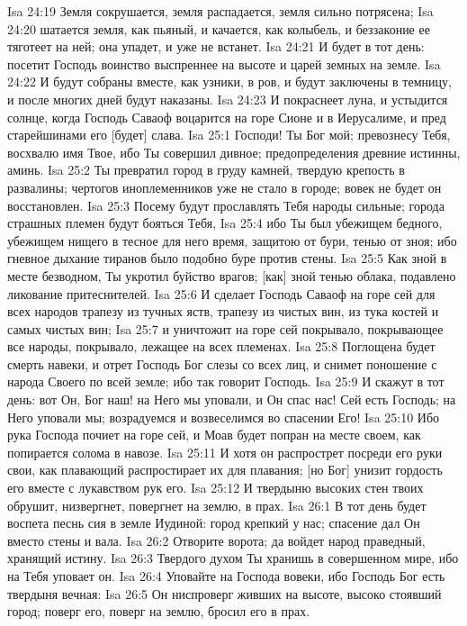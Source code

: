 Isa 24:19  Земля сокрушается, земля распадается, земля сильно потрясена;
Isa 24:20  шатается земля, как пьяный, и качается, как колыбель, и беззаконие ее тяготеет на ней; она упадет, и уже не встанет.
Isa 24:21  И будет в тот день: посетит Господь воинство выспреннее на высоте и царей земных на земле.
Isa 24:22  И будут собраны вместе, как узники, в ров, и будут заключены в темницу, и после многих дней будут наказаны.
Isa 24:23  И покраснеет луна, и устыдится солнце, когда Господь Саваоф воцарится на горе Сионе и в Иерусалиме, и пред старейшинами его [будет] слава.
Isa 25:1  Господи! Ты Бог мой; превознесу Тебя, восхвалю имя Твое, ибо Ты совершил дивное; предопределения древние истинны, аминь.
Isa 25:2  Ты превратил город в груду камней, твердую крепость в развалины; чертогов иноплеменников уже не стало в городе; вовек не будет он восстановлен.
Isa 25:3  Посему будут прославлять Тебя народы сильные; города страшных племен будут бояться Тебя,
Isa 25:4  ибо Ты был убежищем бедного, убежищем нищего в тесное для него время, защитою от бури, тенью от зноя; ибо гневное дыхание тиранов было подобно буре против стены.
Isa 25:5  Как зной в месте безводном, Ты укротил буйство врагов; [как] зной тенью облака, подавлено ликование притеснителей.
Isa 25:6  И сделает Господь Саваоф на горе сей для всех народов трапезу из тучных яств, трапезу из чистых вин, из тука костей и самых чистых вин;
Isa 25:7  и уничтожит на горе сей покрывало, покрывающее все народы, покрывало, лежащее на всех племенах.
Isa 25:8  Поглощена будет смерть навеки, и отрет Господь Бог слезы со всех лиц, и снимет поношение с народа Своего по всей земле; ибо так говорит Господь.
Isa 25:9  И скажут в тот день: вот Он, Бог наш! на Него мы уповали, и Он спас нас! Сей есть Господь; на Него уповали мы; возрадуемся и возвеселимся во спасении Его!
Isa 25:10  Ибо рука Господа почиет на горе сей, и Моав будет попран на месте своем, как попирается солома в навозе.
Isa 25:11  И хотя он распрострет посреди его руки свои, как плавающий распростирает их для плавания; [но Бог] унизит гордость его вместе с лукавством рук его.
Isa 25:12  И твердыню высоких стен твоих обрушит, низвергнет, повергнет на землю, в прах.
Isa 26:1  В тот день будет воспета песнь сия в земле Иудиной: город крепкий у нас; спасение дал Он вместо стены и вала.
Isa 26:2  Отворите ворота; да войдет народ праведный, хранящий истину.
Isa 26:3  Твердого духом Ты хранишь в совершенном мире, ибо на Тебя уповает он.
Isa 26:4  Уповайте на Господа вовеки, ибо Господь Бог есть твердыня вечная:
Isa 26:5  Он ниспроверг живших на высоте, высоко стоявший город; поверг его, поверг на землю, бросил его в прах.
